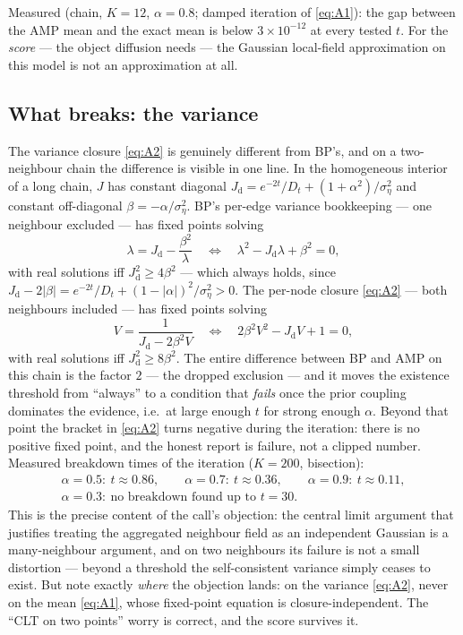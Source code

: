 \documentclass[11pt]{article}
\theoremstyle{definition}
\theoremstyle{remark}
\begin{document}
Measured (chain, $K=12$, $\alpha=0.8$; damped iteration of
\eqref{eq:A1}): the gap between the AMP mean and the exact mean is below
$3\times10^{-12}$ at every tested $t$. For the \emph{score} --- the object
diffusion needs --- the Gaussian local-field approximation on this model is
not an approximation at all.

\subsection{What breaks: the variance}\label{sec:amp-variance}

The variance closure \eqref{eq:A2} is genuinely different from BP's, and on
a two-neighbour chain the difference is visible in one line. In the
homogeneous interior of a long chain, $J$ has constant diagonal
$J_{\mathrm d}=e^{-2t}/D_t+(1+\alpha^2)/\sigma_\eta^2$ and constant
off-diagonal $\beta=-\alpha/\sigma_\eta^2$. BP's per-edge variance
bookkeeping --- one neighbour excluded --- has fixed points solving
\[
  \lambda=J_{\mathrm d}-\frac{\beta^2}{\lambda}
  \quad\Longleftrightarrow\quad
  \lambda^2-J_{\mathrm d}\lambda+\beta^2=0,
\]
with real solutions iff $J_{\mathrm d}^2\ge4\beta^2$ --- which always holds,
since $J_{\mathrm d}-2|\beta|
=e^{-2t}/D_t+(1-|\alpha|)^2/\sigma_\eta^2>0$. The per-node closure
\eqref{eq:A2} --- both neighbours included --- has fixed points solving
\[
  V=\frac1{J_{\mathrm d}-2\beta^2V}
  \quad\Longleftrightarrow\quad
  2\beta^2V^2-J_{\mathrm d}V+1=0,
\]
with real solutions iff $J_{\mathrm d}^2\ge8\beta^2$. The entire difference
between BP and AMP on this chain is the factor $2$ --- the dropped
exclusion --- and it moves the existence threshold from ``always'' to a
condition that \emph{fails} once the prior coupling dominates the evidence,
i.e.\ at large enough $t$ for strong enough $\alpha$. Beyond that point the
bracket in \eqref{eq:A2} turns negative during the iteration: there is no
positive fixed point, and the honest report is failure, not a clipped
number. Measured breakdown times of the iteration ($K=200$, bisection):
\begin{gather*}
  \alpha=0.5:\ t\approx0.86,\qquad
  \alpha=0.7:\ t\approx0.36,\qquad
  \alpha=0.9:\ t\approx0.11,\\
  \alpha=0.3:\ \text{no breakdown found up to }t=30 .
\end{gather*}
This is the precise content of the call's objection: the central limit
argument that justifies treating the aggregated neighbour field as an
independent Gaussian is a many-neighbour argument, and on two neighbours
its failure is not a small distortion --- beyond a threshold the
self-consistent variance simply ceases to exist. But note exactly
\emph{where} the objection lands: on the variance \eqref{eq:A2}, never on
the mean \eqref{eq:A1}, whose fixed-point equation is closure-independent.
The ``CLT on two points'' worry is correct, and the score survives it.
\end{document}

